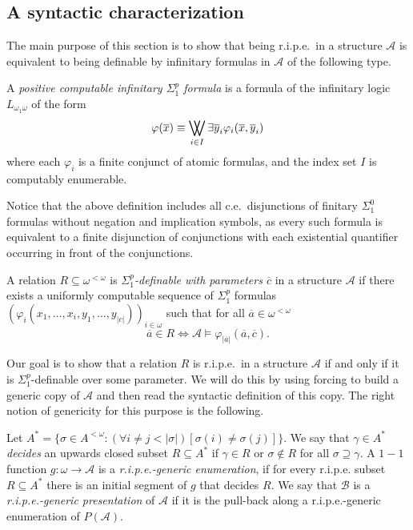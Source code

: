 \documentclass[11pt]{amsart}
\DeclareMathOperator*{\bigdoublevee}{\bigvee\mkern-15mu\bigvee}
\newcommand{\A}{{\mathcal{A}}}
\newcommand{\B}{{\mathcal{B}}}
\newcommand{\N}{\omega}
\renewcommand{\bar}[1]{\overline{#1}}
\renewcommand{\phi}{\varphi}
\newcommand{\oneone}{1{-}1}
\begin{document}
\subsection{A syntactic characterization}
The main purpose of this section is to show that being r.i.p.e.\ in a structure $\A$ is equivalent to being definable by infinitary formulas in $\A$ of the following type.
\begin{defn}
    A \emph{positive computable infinitary $\Sigma_1^p$ formula} is a formula of the infinitary logic $L_{\omega_1\omega}$ of the form
    \begin{equation*}
        \varphi(\overline{x}) \equiv \bigdoublevee_{i \in I} \exists \overline{y}_i \varphi_i (\overline{x},\overline{y}_i)
    \end{equation*}
    where each $\varphi_i$ is a finite conjunct of atomic formulas, and the index set $I$ is computably enumerable.
\end{defn}
Notice that the above definition includes all c.e.\ disjunctions of finitary $\Sigma^0_1$ formulas without negation and implication symbols, as every such formula is equivalent to a finite disjunction of conjunctions with each existential quantifier occurring in front of the conjunctions.
\begin{defn}
    A relation $R\subseteq \N^{<\N}$ is \emph{$\Sigma^p_1$-definable with parameters $\bar c$} in a structure $\A$ if there exists a uniformly computable sequence of $\Sigma^p_1$ formulas $(\phi_i(x_1,\dots,x_i, y_1,\dots,y_{|c|}))_{i\in\omega}$ such that for all $\bar a\in \N^{<\N}$ 
    \[ \bar a\in R \Leftrightarrow \A\models  \phi_{|\bar a|}(\bar a, \bar c).\]
\end{defn}
Our goal is to show that a relation $R$ is r.i.p.e.\ in a structure $\A$ if and only if it is $\Sigma^p_1$-definable over some parameter. We will do this by using forcing to build a generic copy of $\A$ and then read the syntactic definition of this copy. The right notion of genericity for this purpose is the following.
\begin{defn}\label{def:ripegeneric}
 Let $A^* = \{\sigma \in A^{<\omega} : (\forall i \neq j < |\sigma|)[\sigma(i) \neq \sigma(j)]\}$. We say that $\gamma \in A^*$ \emph{decides} an upwards closed subset $R\subseteq A^*$ if $\gamma \in R$ or $\sigma \not \in R$ for all $\sigma \supseteq \gamma$. A $\oneone$ function $g:\omega \rightarrow \A$ is a \emph{r.i.p.e.-generic enumeration}, if for every r.i.p.e. subset $R \subseteq A^*$ there is an initial segment of $g$ that decides $R$. We say that $\B$ is a \emph{r.i.p.e.-generic presentation} of $\A$ if it is the pull-back along a r.i.p.e.-generic enumeration of $P(\A)$.
\end{defn}
\end{document}
